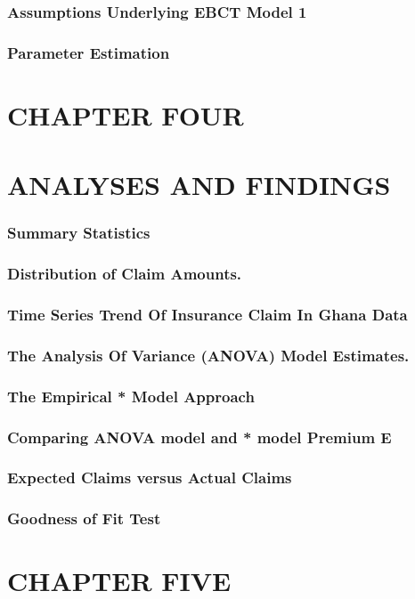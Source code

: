 \documentclass[12pt,a4paper]{article}
\begin{document}
\begin{flushleft}
		\subsubsection{Assumptions Underlying EBCT Model 1}
		\subsubsection{Parameter Estimation}
		\section{CHAPTER  FOUR}
		\section{ANALYSES AND FINDINGS}
		\subsubsection{Summary Statistics}
		\subsubsection{Distribution of Claim Amounts.}
		\subsubsection{Time Series Trend Of Insurance  Claim In  Ghana Data}
		\subsubsection{The Analysis Of Variance (ANOVA) Model Estimates.}
		\subsubsection{The Empirical * Model Approach}
		\subsubsection{Comparing ANOVA model and * model Premium E}
		\subsubsection{Expected Claims versus Actual Claims}
		\subsubsection{Goodness of Fit Test}
		\section{CHAPTER  FIVE}

\end{flushleft}
\end{document}
